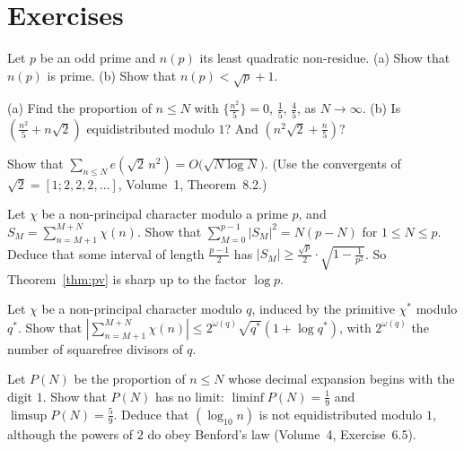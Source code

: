 \section{Exercises}

\begin{exercise}[$\star$]\label{ex:nonres}
Let $p$ be an odd prime and $n(p)$ its least quadratic non-residue. (a) Show that $n(p)$ is prime. (b) Show that $n(p)<\sqrt p+1$.
\end{exercise}

\begin{exercise}[$\star$]\label{ex:rationalsq}
(a) Find the proportion of $n\le N$ with $\{\frac{n^2}5\}=0$, $\frac15$, $\frac45$, as $N\to\infty$. (b) Is $(\frac{n^2}5+n\sqrt2)$ equidistributed modulo $1$? And $(n^2\sqrt2+\frac n5)$?
\end{exercise}

\begin{exercise}[$\star\star$]\label{ex:weylsqrt2}
Show that $\sum_{n\le N}e(\sqrt2\,n^2)=O\bigl(\sqrt{N\log N}\bigr)$. (Use the convergents of $\sqrt2=[1;2,2,2,\dots]$, Volume~1, Theorem~8.2.)
\end{exercise}

\begin{exercise}[$\star\star$]\label{ex:pvsharp}
Let $\chi$ be a non-principal character modulo a prime $p$, and $S_M=\sum_{n=M+1}^{M+N}\chi(n)$. Show that $\sum_{M=0}^{p-1}|S_M|^2=N(p-N)$ for $1\le N\le p$. Deduce that some interval of length $\frac{p-1}2$ has
$|S_M|\ge\frac{\sqrt p}2\cdot\sqrt{1-\frac1{p^2}}$. So Theorem~\ref{thm:pv} is sharp up to the factor $\log p$.
\end{exercise}

\begin{exercise}[$\star\star$]\label{ex:pvnonprim}
Let $\chi$ be a non-principal character modulo $q$, induced by the primitive $\chi^*$ modulo $q^*$. Show that $|\sum_{n=M+1}^{M+N}\chi(n)|\le2^{\omega(q)}\sqrt{q^*}(1+\log q^*)$, with $2^{\omega(q)}$ the number of squarefree divisors of $q$.
\end{exercise}

\begin{exercise}\label{ex:logn}
Let $P(N)$ be the proportion of $n\le N$ whose decimal expansion begins with the digit $1$. Show that $P(N)$ has no limit: $\liminf P(N)=\frac19$ and $\limsup P(N)=\frac59$. Deduce that $(\log_{10}n)$ is not equidistributed modulo
$1$, although the powers of $2$ do obey Benford's law (Volume~4, Exercise~6.5).
\end{exercise}

